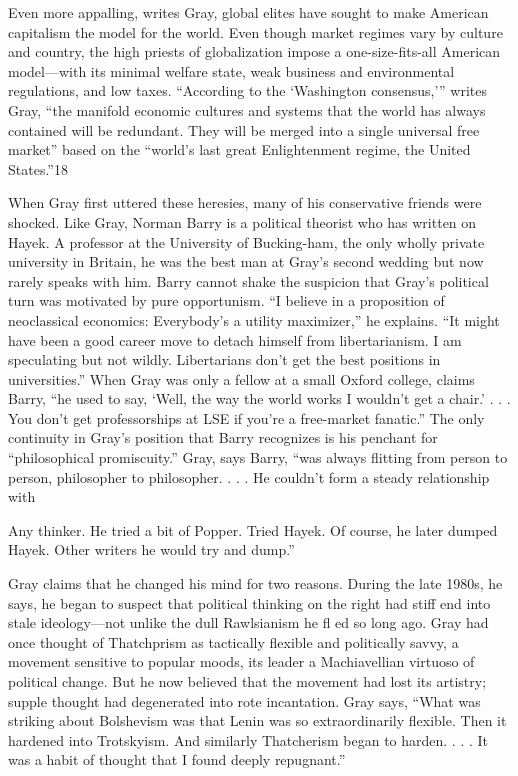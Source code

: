 Even more appalling, writes Gray, global elites have sought to make American capitalism the model for the world. Even though market regimes vary by culture and country, the high priests of globalization impose a one-size-fits-all American model—with its minimal welfare state, weak business and environmental regulations, and low taxes. “According to the ‘Washington consensus,’” writes Gray, “the manifold economic cultures and systems that the world has always contained will be redundant. They will be merged into a single universal free market” based on the “world’s last great Enlightenment regime, the United States.”{\color{blue}18}
 \par 
When Gray first uttered these heresies, many of his conservative friends were shocked. Like Gray, Norman Barry is a political theorist who has written on Hayek. A professor at the University of Bucking-ham, the only wholly private university in Britain, he was the best man at Gray’s second wedding but now rarely speaks with him. Barry cannot shake the suspicion that Gray’s political turn was motivated by pure opportunism. “I believe in a proposition of neoclassical economics: Everybody’s a utility maximizer,” he explains. “It might have been a good career move to detach himself from libertarianism. I am speculating but not wildly. Libertarians don’t get the best positions in universities.” When Gray was only a fellow at a small Oxford college, claims Barry, “he used to say, ‘Well, the way the world works I wouldn’t get a chair.’ . . . You don’t get professorships at LSE if you’re a free-market fanatic.” The only continuity in Gray’s position that Barry recognizes is his penchant for “philosophical promiscuity.” Gray, says Barry, “was always flitting from person to person, philosopher to philosopher. . . . He couldn’t form a steady relationship with
 \par 
Any thinker. He tried a bit of Popper. Tried Hayek. Of course, he later dumped Hayek. Other writers he would try and dump.”
 \par 
Gray claims that he changed his mind for two reasons. During the late 1980s, he says, he began to suspect that political thinking on the right had stiff end into stale ideology—not unlike the dull Rawlsianism he fl ed so long ago. Gray had once thought of Thatchprism as tactically flexible and politically savvy, a movement sensitive to popular moods, its leader a Machiavellian virtuoso of political change. But he now believed that the movement had lost its artistry; supple thought had degenerated into rote incantation. Gray says, “What was striking about Bolshevism was that Lenin was so extraordinarily flexible. Then it hardened into Trotskyism. And similarly Thatcherism began to harden. . . . It was a habit of thought that I found deeply repugnant.”
